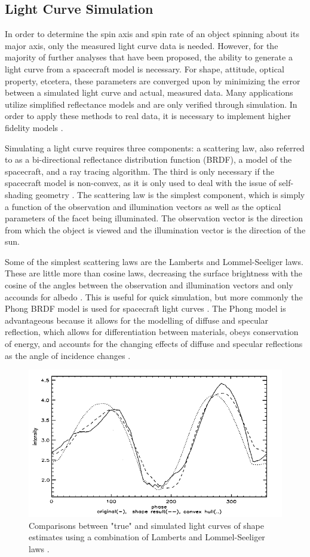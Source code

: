 \documentclass{article}
\begin{document}
\subsection{Light Curve Simulation}

In order to determine the spin axis and spin rate of an object spinning about its major axis, only the measured light curve data is needed. However, for the majority of further analyses that have been proposed, the ability to generate a light curve from a spacecraft model is necessary. For shape, attitude, optical property, etcetera, these parameters are converged upon by minimizing the error between a simulated light curve and actual, measured data. Many applications utilize simplified reflectance models and are only verified through simulation. In order to apply these methods to real data, it is necessary to implement higher fidelity models \cite{AttitudeEstimationFromLightCurve}.

Simulating a light curve requires three components: a scattering law, also referred to as a bi-directional reflectance distribution function (BRDF), a model of the spacecraft, and a ray tracing algorithm. The third is only necessary if the spacecraft model is non-convex, as it is only used to deal with the issue of self-shading geometry \cite{Kaasalainen}. The scattering law is the simplest component, which is simply a function of the observation and illumination vectors as well as the optical parameters of the facet being illuminated. The observation vector is the direction from which the object is viewed and the illumination vector is the direction of the sun.

Some of the simplest scattering laws are the Lamberts and Lommel-Seeliger laws. These are little more than cosine laws, decreasing the surface brightness with the cosine of the angles between the observation and illumination vectors and only accounds for albedo \cite{Kaasalainen} \cite{Bradley2014LIGHTCURVEIF}. This is useful for quick simulation, but more commonly the Phong BRDF model is used for spacecraft light curves \cite{StateAndParameter} \cite{SpaceObjectCharacterization} \cite{LINARES20141}. The Phong model is advantageous because it allows for the modelling of diffuse and specular reflection, which allows for differentiation between materials, obeys conservation of energy, and accounts for the changing effects of diffuse and specular reflections as the angle of incidence changes \cite{Ashikhmin}.

\begin{figure}[h]
	\centering
	\includegraphics[width=.5\textwidth]{lightcurve_simulation}
	\caption{Comparisons between "true" and simulated light curves of shape estimates using a combination of Lamberts and Lommel-Seeliger laws \cite{Kaasalainen}.}
\end{figure}
\end{document}

